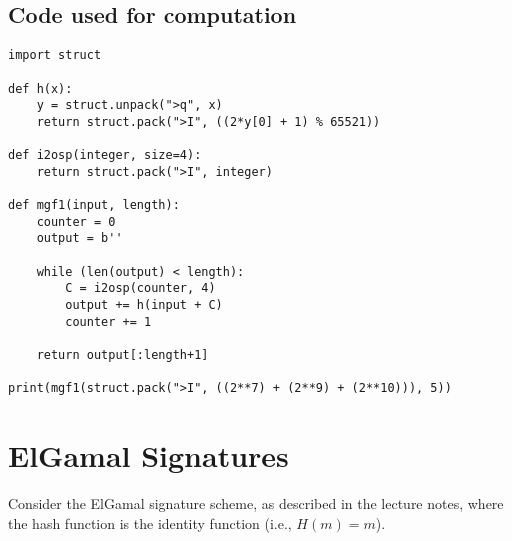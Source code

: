 \documentclass[12pt, letterpaper]{article}
\begin{document}
\subsection{Code used for computation}
\begin{lstlisting}
import struct

def h(x):
    y = struct.unpack(">q", x)
    return struct.pack(">I", ((2*y[0] + 1) % 65521))

def i2osp(integer, size=4):
    return struct.pack(">I", integer)

def mgf1(input, length):
    counter = 0
    output = b''
    
    while (len(output) < length):
        C = i2osp(counter, 4)
        output += h(input + C)
        counter += 1
  
    return output[:length+1]
    
print(mgf1(struct.pack(">I", ((2**7) + (2**9) + (2**10))), 5))
\end{lstlisting}


\newpage

\section{ElGamal Signatures}

Consider the ElGamal signature scheme, as described in the 
lecture notes, where the hash function is the identity 
function (i.e., $H(m) = m$).
\end{document}
